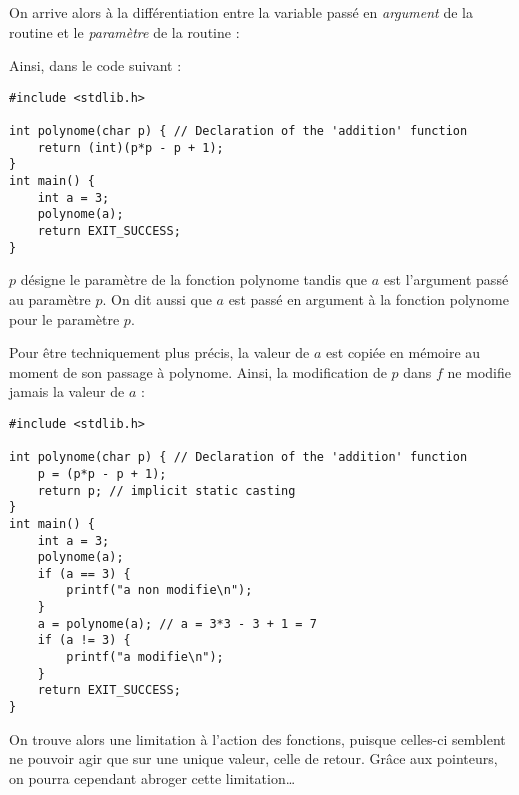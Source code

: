 \documentclass[../../../main.tex]{subfiles}
\begin{document}
On arrive alors à la différentiation entre la variable passé en \textit{argument} de la routine et le \textit{paramètre} de la routine :  

Ainsi, dans le code suivant :
\begin{verbatim}
#include <stdlib.h>

int polynome(char p) { // Declaration of the 'addition' function
	return (int)(p*p - p + 1);
}
int main() {
	int a = 3;
	polynome(a);
	return EXIT_SUCCESS;
}
\end{verbatim}
$p$ désigne le paramètre de la fonction \textsf{polynome} tandis que $a$ est l'argument passé au paramètre $p$. On dit aussi que $a$ est passé en argument à la fonction \textsf{polynome} pour le paramètre $p$.
 
Pour être techniquement plus précis, la valeur de $a$ est copiée en mémoire au moment de son passage à \textsf{polynome}. Ainsi, la modification de $p$ dans $f$ ne modifie jamais la valeur de $a$ :
\begin{verbatim}
#include <stdlib.h>

int polynome(char p) { // Declaration of the 'addition' function
	p = (p*p - p + 1);
	return p; // implicit static casting
}
int main() {
	int a = 3;
	polynome(a);
	if (a == 3) {
		printf("a non modifie\n");
	}
	a = polynome(a); // a = 3*3 - 3 + 1 = 7
	if (a != 3) {
		printf("a modifie\n");
	}
	return EXIT_SUCCESS;
}
\end{verbatim}
On trouve alors une limitation à l'action des fonctions, puisque celles-ci semblent ne pouvoir agir que sur une unique valeur, celle de retour. Grâce aux pointeurs, on pourra cependant abroger cette limitation\dots
\end{document}
